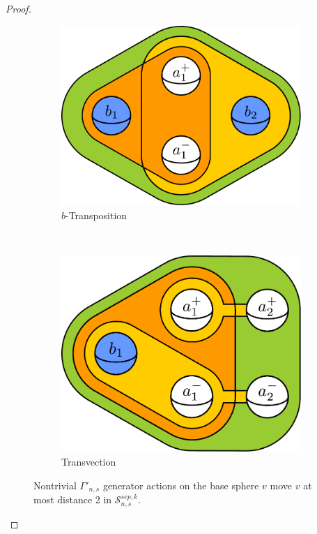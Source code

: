 \documentclass[11pt]{article}
\theoremstyle{remark}
\theoremstyle{definition}
\begin{document}
\begin{proof}
\begin{figure}[b!]
\begin{subfigure}[b]{0.3\textwidth}
        \includegraphics[width=\textwidth]{figures/kput3.pdf}
        \caption{$b$-Transposition}
        \label{fig:kput3}
    \end{subfigure}
    ~ %
    \begin{subfigure}[b]{0.3\textwidth}
        \includegraphics[width=\textwidth]{figures/kput4.pdf}
        \caption{Transvection}
        \label{fig:kput4}
    \end{subfigure}
    \caption{Nontrivial $\Gamma'_{n,s}$ generator actions on the
    base sphere $v$ move $v$ at most distance 2
    in $\mathcal S^{sep,k}_{n,s}$.}
    \label{fig:kput234}
\end{figure}
\end{proof}
\end{document}
